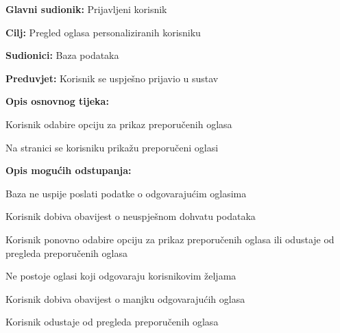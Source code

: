 					\noindent {}
					\begin{packed_item}
	
						\item \textbf{Glavni sudionik: }Prijavljeni korisnik
						\item  \textbf{Cilj:} Pregled oglasa personaliziranih korisniku
						\item  \textbf{Sudionici:} Baza podataka
						\item  \textbf{Preduvjet:} Korisnik se uspješno prijavio u sustav
						\item  \textbf{Opis osnovnog tijeka:}
						
						\item[] \begin{packed_enum}
							\item Korisnik odabire opciju za prikaz preporučenih oglasa
							\item Na stranici se korisniku prikažu preporučeni oglasi
						\end{packed_enum}

						\item  \textbf{Opis mogućih odstupanja:}

						\item[] \begin{packed_item}
							\item[2.a] Baza ne uspije poslati podatke o odgovarajućim oglasima
							\item[] \begin{packed_enum}
								
								\item Korisnik dobiva obavijest o neuspješnom dohvatu podataka
								\item Korisnik ponovno odabire opciju za prikaz preporučenih oglasa ili odustaje od pregleda preporučenih oglasa
							
							\end{packed_enum}	
							\item[2.b] Ne postoje oglasi koji odgovaraju korisnikovim željama
							\item[] \begin{packed_enum}
								
								\item Korisnik dobiva obavijest o manjku odgovarajućih oglasa
								\item Korisnik odustaje od pregleda preporučenih oglasa
							
							\end{packed_enum}	
						\end{packed_item}
						
					\end{packed_item}

